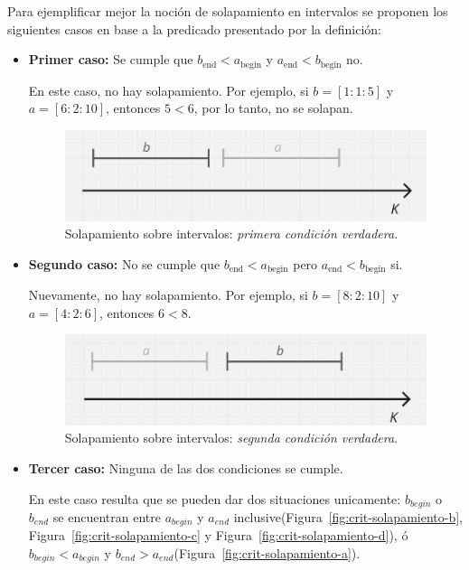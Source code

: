 Para ejemplificar mejor la noción de solapamiento en intervalos se proponen los siguientes casos en base a la predicado presentado por la definición:

\begin{itemize}
    \item \textbf{Primer caso:} Se cumple que $b_{\text{end}} < a_{\text{begin}}$ y $a_{\text{end}} < b_{\text{begin}}$ no.

    En este caso, no hay solapamiento. Por ejemplo, si $b = [1:1:5]$ y $a = [6:2:10]$, entonces $5 < 6$, por lo tanto, no se solapan.

    \begin{figure}[h]
        \centering
        \includegraphics[width=0.75\linewidth]{figures/Optimazaciones/Interseccion/crit sol 10.png}
        \caption{Solapamiento sobre intervalos: \textit{primera condición verdadera}.}
    \end{figure}

    \item \textbf{Segundo caso:} No se cumple que $b_{\text{end}} < a_{\text{begin}}$ pero $a_{\text{end}} < b_{\text{begin}}$ si.

    Nuevamente, no hay solapamiento. Por ejemplo, si $b = [8:2:10]$ y $a = [4:2:6]$, entonces $6 < 8$.

    \begin{figure}[h]
        \centering
        \includegraphics[width=0.75\linewidth]{figures/Optimazaciones/Interseccion/crit sol01.png}
        \caption{Solapamiento sobre intervalos: \textit{segunda condición verdadera}.}
    \end{figure}

    \item \textbf{Tercer caso:} Ninguna de las dos condiciones se cumple.

    En este caso resulta que se pueden dar dos situaciones unicamente: $b_{begin}$ o $b_{end}$ se encuentran entre $a_{begin}$ y $a_{end}$ inclusive(Figura~\ref{fig:crit-solapamiento-b}, Figura~\ref{fig:crit-solapamiento-c} y Figura~\ref{fig:crit-solapamiento-d}), ó $b_{begin} < a_{begin}$ y $b_{end}>a_{end}$(Figura~\ref{fig:crit-solapamiento-a}).


\end{itemize}
